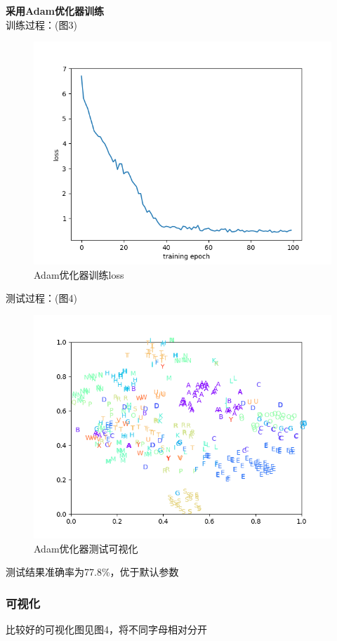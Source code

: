 \documentclass[a4paper]{article}
\begin{document}
\textbf{采用Adam优化器训练}\\
训练过程：(图3)\\
\begin{figure}
    \centering
    \includegraphics[width=12cm]{Fig3.png}
    \caption{Adam优化器训练loss}
\end{figure}
测试过程：(图4)\\
\begin{figure}
    \centering
    \includegraphics[width=12cm]{Fig4.png}
    \caption{Adam优化器测试可视化}
\end{figure}
测试结果准确率为77.8\%，优于默认参数

\subsubsection{可视化}
比较好的可视化图见图4，将不同字母相对分开
\end{document}
